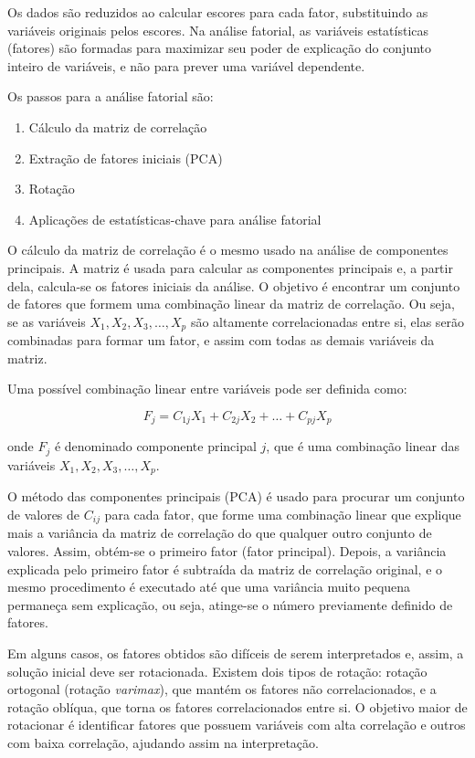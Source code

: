 \documentclass[
]{estat/estat}
\providecommand{\tightlist}{%
  \setlength{\itemsep}{0pt}\setlength{\parskip}{0pt}}\usepackage{longtable,booktabs,array}
\begin{document}
Os dados são reduzidos ao calcular escores para cada fator, substituindo
as variáveis originais pelos escores. Na análise fatorial, as variáveis
estatísticas (fatores) são formadas para maximizar seu poder de
explicação do conjunto inteiro de variáveis, e não para prever uma
variável dependente.

Os passos para a análise fatorial são:

\begin{enumerate}
\def\labelenumi{\arabic{enumi}.}
\tightlist
\item
  Cálculo da matriz de correlação
\item
  Extração de fatores iniciais (PCA)
\item
  Rotação
\item
  Aplicações de estatísticas-chave para análise fatorial
\end{enumerate}

O cálculo da matriz de correlação é o mesmo usado na análise de
componentes principais. A matriz é usada para calcular as componentes
principais e, a partir dela, calcula-se os fatores iniciais da análise.
O objetivo é encontrar um conjunto de fatores que formem uma combinação
linear da matriz de correlação. Ou seja, se as variáveis
\(X_1, X_2, X_3, \ldots, X_p\) são altamente correlacionadas entre si,
elas serão combinadas para formar um fator, e assim com todas as demais
variáveis da matriz.

Uma possível combinação linear entre variáveis pode ser definida como:

\[ F_j = C_{1j} X_1 + C_{2j} X_2 + \ldots + C_{pj} X_p \]

onde \(F_j\) é denominado componente principal \(j\), que é uma
combinação linear das variáveis \(X_1, X_2, X_3, \ldots, X_p\).

O método das componentes principais (PCA) é usado para procurar um
conjunto de valores de \(C_{ij}\) para cada fator, que forme uma
combinação linear que explique mais a variância da matriz de correlação
do que qualquer outro conjunto de valores. Assim, obtém-se o primeiro
fator (fator principal). Depois, a variância explicada pelo primeiro
fator é subtraída da matriz de correlação original, e o mesmo
procedimento é executado até que uma variância muito pequena permaneça
sem explicação, ou seja, atinge-se o número previamente definido de
fatores.

Em alguns casos, os fatores obtidos são difíceis de serem interpretados
e, assim, a solução inicial deve ser rotacionada. Existem dois tipos de
rotação: rotação ortogonal (rotação \emph{varimax}), que mantém os
fatores não correlacionados, e a rotação oblíqua, que torna os fatores
correlacionados entre si. O objetivo maior de rotacionar é identificar
fatores que possuem variáveis com alta correlação e outros com baixa
correlação, ajudando assim na interpretação.
\end{document}
